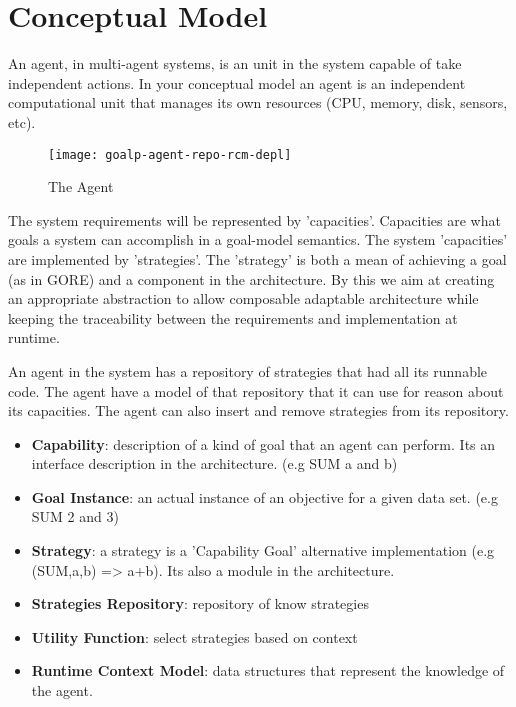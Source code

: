 \section{Conceptual Model}
\label{conceptual_model}

An agent, in multi-agent systems, is an unit in the system capable of take independent actions. In your conceptual model an agent is an independent computational unit that manages its own resources (CPU, memory, disk, sensors, etc).

\begin{figure}
  \centering
  \texttt{[image: goalp-agent-repo-rcm-depl]}
  \caption{The Agent}
  \label{fig:goalp-agent}
\end{figure}



The system requirements will be represented by 'capacities'. Capacities are what goals a system can accomplish in a goal-model semantics. The system 'capacities' are implemented by 'strategies'.
The 'strategy' is both a mean of achieving a goal (as in GORE) and a component in the architecture. By this we aim at creating an appropriate abstraction to allow composable adaptable architecture while keeping the traceability between the requirements and implementation at runtime.

An agent in the system has a repository of strategies that had all its runnable code. The agent have a model of that repository that it can use for reason about its capacities. The agent can also insert and remove strategies from its repository.

\begin{itemize}
  \item \textbf{Capability}: description of a kind of goal that an agent can perform.   Its an interface description in the architecture. (e.g SUM a and b)
  \item \textbf{Goal Instance}: an actual instance of an objective for a given data set. (e.g SUM 2 and 3)
  \item \textbf{Strategy}: a strategy is a 'Capability Goal' alternative implementation (e.g (SUM,a,b) => {a+b}). Its also a module in the architecture.
  \item \textbf{Strategies Repository}: repository of know strategies
  \item \textbf{Utility Function}: select strategies based on context
  \item \textbf{Runtime Context Model}: data structures that represent the knowledge of the agent.
\end{itemize}

